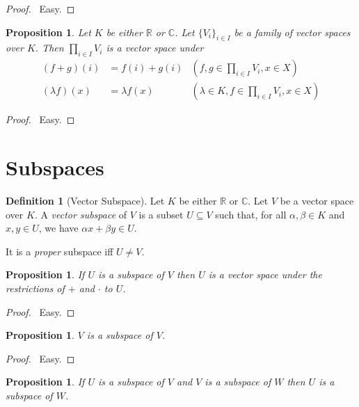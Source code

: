 \documentclass{book}
\let\qed\relax
\newtheorem{prop}[ax]{Proposition}
\theoremstyle{definition}
\newtheorem{df}[ax]{Definition}
\begin{document}
\begin{proof}
\pf\ Easy. \qed
\end{proof}

\begin{prop}
Let $K$ be either $\mathbb{R}$ or $\mathbb{C}$. Let $\{ V_i \}_{i \in I}$ be a family of vector spaces over $K$. Then $\prod_{i \in I} V_i$ is a vector space under
\begin{align*}
(f + g)(i) & = f(i) + g(i) & (f,g \in \prod_{i \in I} V_i, x \in X) \\
(\lambda f)(x) & = \lambda f(x) & (\lambda \in K, f \in \prod_{i \in I} V_i, x \in X)
\end{align*}
\end{prop}

\begin{proof}
\pf\ Easy. \qed
\end{proof}

\section{Subspaces}

\begin{df}[Vector Subspace]
Let $K$ be either $\mathbb{R}$ or $\mathbb{C}$. Let $V$ be a vector space over $K$. A \emph{vector subspace} of $V$ is a subset $U \subseteq V$ such that, for all $\alpha, \beta \in K$ and $x,y \in U$, we have $\alpha x + \beta y \in U$.

It is a \emph{proper} subspace iff $U \neq V$.
\end{df}

\begin{prop}
If $U$ is a subspace of $V$ then $U$ is a vector space under the restrictions of $+$ and $\cdot$ to $U$.
\end{prop}

\begin{proof}
\pf\ Easy. \qed
\end{proof}

\begin{prop}
$V$ is a subspace of $V$.
\end{prop}

\begin{proof}
\pf\ Easy. \qed
\end{proof}

\begin{prop}
If $U$ is a subspace of $V$ and $V$ is a subspace of $W$ then $U$ is a subspace of $W$.
\end{prop}
\end{document}
